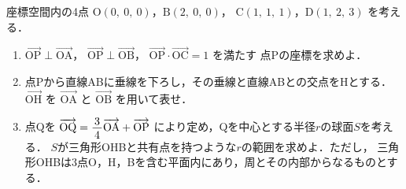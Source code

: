 ﻿\documentclass[../../../uem_tok_q.tex]{subfiles}
\begin{document}
    座標空間内の4点 $\mathrm{O}(0,\:0,\:0)$，$\mathrm{B}(2,\:0,\:0)$，%
    $\mathrm{C}(1,\:1,\:1)$，$\mathrm{D}(1,\:2,\:3)$ を考える．

    \begin{enumerate}
        \item $\overrightarrow{\mathrm{OP}}\perp\overrightarrow{\mathrm{OA}}$，%
            $\overrightarrow{\mathrm{OP}}\perp\overrightarrow{\mathrm{OB}}$，%
            $\overrightarrow{\mathrm{OP}}\cdot\overrightarrow{\mathrm{OC}}=1$ を満たす%
            点Pの座標を求めよ．
        \item 点Pから直線ABに垂線を下ろし，その垂線と直線ABとの交点をHとする．%
            $\overrightarrow{\mathrm{OH}}$ を $\overrightarrow{\mathrm{OA}}$ と %
            $\overrightarrow{\mathrm{OB}}$ を用いて表せ．
        \item 点Qを $\overrightarrow{\mathrm{OQ}}=\myfraca{3}{4}\overrightarrow{\mathrm{OA}}%
            +\overrightarrow{\mathrm{OP}}$ により定め，Qを中心とする半径$r$の球面$S$を考える．%
            $S$が三角形OHBと共有点を持つような$r$の範囲を求めよ．ただし，%
            三角形OHBは3点O，H，Bを含む平面内にあり，周とその内部からなるものとする．
    \end{enumerate}
\end{document}
